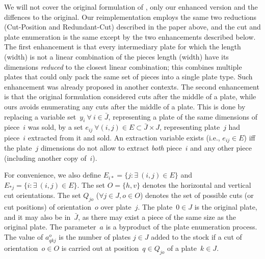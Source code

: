 \documentclass[9pt]{entcs}
\begin{document}
We will not cover the original formulation of \cite{furini:2016}, only our enhanced version and the diffences to the original.
Our reimplementation employs the same two reductions (Cut-Position and Redundant-Cut) described in the paper above, and the cut and plate enumeration is the same except by the two enhancements described below.
The first enhancement is that every intermediary plate for which the length (width) is not a linear combination of the pieces length (width) have its dimensions \emph{reduced} to the closest linear combination; this combines multiple plates that could only pack the same set of pieces into a single plate type.
Such enhancement was already proposed in another contexts\cite{alvarez:2009,dolatabadi:2012}.
The second enhancement is that the original formulation considered cuts after the middle of a plate, while ours avoids enumerating any cuts after the middle of a plate.
This is done by replacing a variable set~\(y_i~\forall~i \in \bar{J}\), representing a plate of the same dimensions of piece~\(i\) was sold, by a set \(e_{ij}~\forall (i, j) \in E \subset \bar{J} \times J\), representing plate~\(j\) had piece~\(i\) extracted from it and sold.
An extraction variable exists (i.e., \(e_{ij} \in E\)) iff the plate~\(j\) dimensions do not allow to extract \emph{both} piece~\(i\) and any other piece (including another copy of~\(i\)).

For convenience, we also define \(E_{i*} = \{ j : \exists~(i, j) \in E \}\) and \(E_{*j} = \{i : \exists~(i, j) \in E \}\).
The set \(O = \{h, v\}\) denotes the horizontal and vertical cut orientations.
The set \(Q_{jo}\) (\(\forall j \in J, o \in O\)) denotes the set of possible cuts (or cut positions) of orientation~\(o\) over plate~\(j\).
The plate~\(0 \in J\) is the original plate, and it may also be in~\(\bar{J}\), as there may exist a piece of the same size as the original plate.
The parameter~\(a\) is a byproduct of the plate enumeration process.
The value of \(a^o_{qkj}\) is the number of plates \(j \in J\) added to the stock if a cut of orientation~\(o \in O\) is carried out at position~\(q \in Q_{jo}\) of a plate~\(k \in J\).
\end{document}

